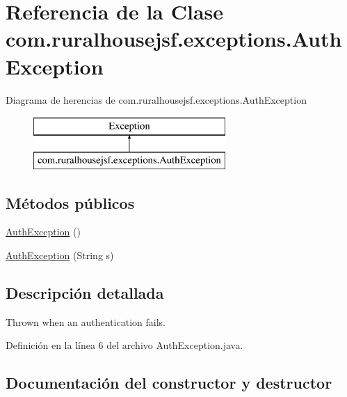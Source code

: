 \hypertarget{classcom_1_1ruralhousejsf_1_1exceptions_1_1_auth_exception}{}\section{Referencia de la Clase com.\+ruralhousejsf.\+exceptions.\+Auth\+Exception}
\label{classcom_1_1ruralhousejsf_1_1exceptions_1_1_auth_exception}
Diagrama de herencias de com.\+ruralhousejsf.\+exceptions.\+Auth\+Exception\begin{figure}[H]
\begin{center}
\leavevmode
\includegraphics[height=2.000000cm]{classcom_1_1ruralhousejsf_1_1exceptions_1_1_auth_exception}
\end{center}
\end{figure}
\subsection*{Métodos públicos}
\begin{DoxyCompactItemize}
\item 
\mbox{\hyperlink{classcom_1_1ruralhousejsf_1_1exceptions_1_1_auth_exception_a092e5eb20bddab6f6741d8a04c7f05a2}{Auth\+Exception}} ()
\item 
\mbox{\hyperlink{classcom_1_1ruralhousejsf_1_1exceptions_1_1_auth_exception_ac4b5a1b9673da9a2de397154017a0c1e}{Auth\+Exception}} (String s)
\end{DoxyCompactItemize}


\subsection{Descripción detallada}
Thrown when an authentication fails. 

Definición en la línea 6 del archivo Auth\+Exception.\+java.



\subsection{Documentación del constructor y destructor}
\mbox{\label{classcom_1_1ruralhousejsf_1_1exceptions_1_1_auth_exception_a092e5eb20bddab6f6741d8a04c7f05a2}} 
